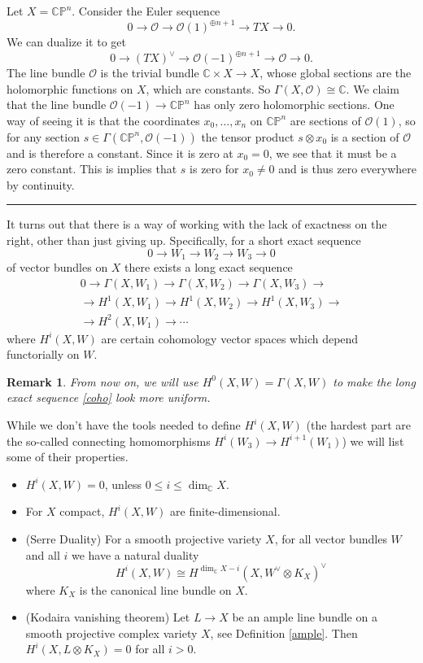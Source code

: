 \documentclass[11pt]{article}
\numberwithin{equation}{section}
\numberwithin{footnote}{section}
\newtheorem{rem}[thm]{Remark}
\newcommand{\blue}{\color{blue}}
\renewcommand{\P}{{\mathbb P}}
\newcommand{\C}{{\mathbb C}}
\begin{document}
\smallskip
Let $X=\C\P^n$. Consider the Euler sequence
$$
0\to \mathcal O \to \mathcal O(1)^{\oplus n+1} \to TX \to 0.
$$
We can dualize it to get 
$$
0\to (TX)^\vee \to \mathcal O(-1)^{\oplus n+1} \to \mathcal O \to 0.
$$
The line bundle $\mathcal O$ is the trivial bundle $\C\times X\to X$, whose global sections are the holomorphic functions on $X$, which are constants. So $\Gamma(X,\mathcal O) \cong \C$. We claim that the line bundle 
$\mathcal O(-1)\to \C\P^n$ has only zero holomorphic sections. One way of seeing it is that the coordinates $x_0,\ldots, x_n$ on $\C\P^n$ are sections of $\mathcal O(1)$, so for any section $s\in \Gamma(\C\P^n,\mathcal O(-1))$ the tensor product $s \otimes x_0$ is a section of $\mathcal O$ and is therefore a constant. Since it is zero at $x_0=0$, we see that it must be a zero constant. This is implies that $s$ is zero for $x_0\neq 0$ and is thus zero everywhere by continuity.

\smallskip
{\blue \hrule}
It turns out that there is a way of working with the lack of exactness on the right, other than just giving up.
Specifically, for a short exact sequence 
$$
0\to W_1 \to W_2\to W_3 \to 0
$$
of vector bundles on $X$ there exists a long exact sequence
\begin{equation}\label{coho}
\begin{array}{l}
0\to \Gamma(X,W_1) \to \Gamma(X,W_2) \to \Gamma(X,W_3) \to\\[.5em]
\to H^1(X,W_1)\to H^1(X,W_2)\to H^1(X,W_3)\to\\[.5em]
\to H^2(X,W_1)\to \cdots %
\end{array}
\end{equation}
where $H^i(X,W)$ are certain {\blue cohomology} vector spaces which depend functorially on $W$. 
\begin{rem}
From now on, we will use $H^0(X,W)=\Gamma(X,W)$ to make the long exact sequence \eqref{coho} look more uniform.
\end{rem}

While we don't have the tools needed to define $H^i(X,W)$ (the hardest part are the so-called connecting homomorphisms $H^i(W_3)\to H^{i+1}(W_1)$) we will list some of their properties.
\begin{itemize}
\item $H^i(X,W)=0$, unless $0\leq i \leq \dim_\C X$.

\item For $X$ compact, $H^i(X,W)$ are finite-dimensional.

\item (Serre Duality) For a smooth projective variety $X$, for all vector bundles $W$ and all $i$ we have a natural duality 
$$
H^i(X,W) \cong H^{\dim_\C X -i} (X, W^\vee \otimes K_X)^\vee
$$
where $K_X$ is the canonical line bundle on $X$.

\item (Kodaira vanishing theorem) Let $L\to X$ be an ample line bundle on a smooth projective complex variety $X$, see Definition \ref{ample}. Then $H^i(X, L \otimes K_X)=0$ for all $i>0$.

\end{itemize}
\end{document}
